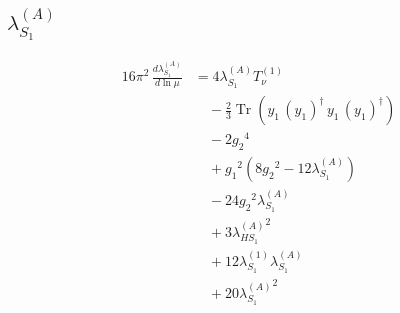 \documentclass[10pt,a4paper]{article}
\begin{document}
\subsection*{$\lambda_{S_1}^{(A)}$}
\begin{align*}
16\pi^2\,\frac{d \lambda_{S_1}^{(A)}}{d\ln\mu} &=4 {\lambda_{S_1}^{(A)}} T_{\nu}^{(1)} \\
&\quad -\frac{2}{3} \operatorname{Tr}\!\left({y_1}\,\left({y_1}\right)^{\dagger}\,{y_1}\,\left({y_1}\right)^{\dagger}\right) \\
&\quad -2 {g_2}^4 \\
&\quad +{g_1}^2 \left(8 {g_2}^2-12 {\lambda_{S_1}^{(A)}}\right) \\
&\quad -24 {g_2}^2 {\lambda_{S_1}^{(A)}} \\
&\quad +3 {\lambda_{HS_1}^{(A)}}^2 \\
&\quad +12 {\lambda_{S_1}^{(1)}} {\lambda_{S_1}^{(A)}} \\
&\quad +20 {\lambda_{S_1}^{(A)}}^2 \\
\end{align*}
\end{document}
